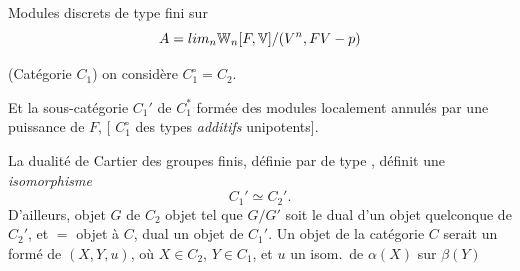 \documentclass[11pt,a4paper]{article}
\begin{document}
Modules discrets \struck{\ill{}} de type fini sur
\[
A = \varprojlim_n \mathbb{W}_n[F, \mathbb{V}]/(V^n, FV - p)
\]

(Catégorie $C_1$) \quad on considère $C_1^\circ = C_2$.

Et la sous-catégorie  $C_1'$ de $C_1^{*}$ formée des modules
localement annulés par une puissance de $F$,  [\ill{} \ill{} $C_1^\circ$ \ill{} \ill{} \struck{\ill{}} des types
 \emph{additifs} unipotents].

La dualité de Cartier des groupes finis, définie par  \ill{} de
type , définit une \emph{isomorphisme}
\[
C_1' \simeq C_2' .
\]
D'ailleurs, \ill{} objet $G$ de $C_2$ \ill{} \ill{} \ill{} \ill{} objet
\ill{} tel que $G/G'$ \struck{\ill{}} soit le dual d'un objet quelconque de
$C_2'$, et \ill{} $=$ \ill{} objet à $C$, \ill{} dual \ill{} un objet
\struck{\ill{}} \ill{} de $C_1'$. Un objet de la \ill{} catégorie $C$ serait
un   formé de $(X, Y, u)$, où $X \in C_2$,
$Y \in C_1$, et $u$ un isom.\ de $\alpha(X)$ sur $\beta(Y)$


\end{document}
